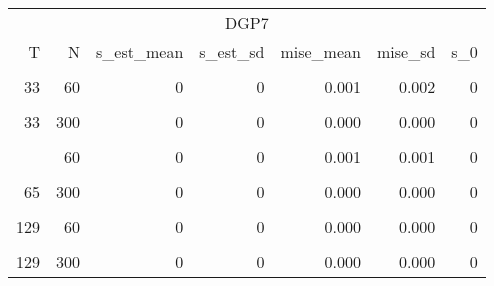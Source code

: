\begin{table}
\centering
\begin{tabular}{rrrrrrr}
\toprule
\multicolumn{7}{c}{DGP7} \\
\cmidrule(l{3pt}r{3pt}){1-7}
T & N & s\_est\_mean & s\_est\_sd & mise\_mean & mise\_sd & s\_0\\
\midrule
\cellcolor{gray!6}{33} & \cellcolor{gray!6}{30} & \cellcolor{gray!6}{0} & \cellcolor{gray!6}{0} & \cellcolor{gray!6}{0.002} & \cellcolor{gray!6}{0.003} & \cellcolor{gray!6}{0}\\
33 & 60 & 0 & 0 & 0.001 & 0.002 & 0\\
\cellcolor{gray!6}{33} & \cellcolor{gray!6}{120} & \cellcolor{gray!6}{0} & \cellcolor{gray!6}{0} & \cellcolor{gray!6}{0.001} & \cellcolor{gray!6}{0.001} & \cellcolor{gray!6}{0}\\
33 & 300 & 0 & 0 & 0.000 & 0.000 & 0\\
\cellcolor{gray!6}{65} & \cellcolor{gray!6}{30} & \cellcolor{gray!6}{0} & \cellcolor{gray!6}{0} & \cellcolor{gray!6}{0.001} & \cellcolor{gray!6}{0.001} & \cellcolor{gray!6}{0}\\
\addlinespace
65 & 60 & 0 & 0 & 0.001 & 0.001 & 0\\
\cellcolor{gray!6}{65} & \cellcolor{gray!6}{120} & \cellcolor{gray!6}{0} & \cellcolor{gray!6}{0} & \cellcolor{gray!6}{0.000} & \cellcolor{gray!6}{0.000} & \cellcolor{gray!6}{0}\\
65 & 300 & 0 & 0 & 0.000 & 0.000 & 0\\
\cellcolor{gray!6}{129} & \cellcolor{gray!6}{30} & \cellcolor{gray!6}{0} & \cellcolor{gray!6}{0} & \cellcolor{gray!6}{0.001} & \cellcolor{gray!6}{0.001} & \cellcolor{gray!6}{0}\\
129 & 60 & 0 & 0 & 0.000 & 0.000 & 0\\
\addlinespace
\cellcolor{gray!6}{129} & \cellcolor{gray!6}{120} & \cellcolor{gray!6}{0} & \cellcolor{gray!6}{0} & \cellcolor{gray!6}{0.000} & \cellcolor{gray!6}{0.000} & \cellcolor{gray!6}{0}\\
129 & 300 & 0 & 0 & 0.000 & 0.000 & 0\\
\bottomrule
\end{tabular}
\end{table}
